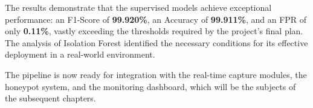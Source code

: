 The results demonstrate that the supervised models achieve exceptional performance: an F1-Score of \textbf{99.920\%}, an Accuracy of \textbf{99.911\%}, and an FPR of only \textbf{0.11\%}, vastly exceeding the thresholds required by the project's final plan. The analysis of Isolation Forest identified the necessary conditions for its effective deployment in a real-world environment.

The pipeline is now ready for integration with the real-time capture modules, the honeypot system, and the monitoring dashboard, which will be the subjects of the subsequent chapters.
